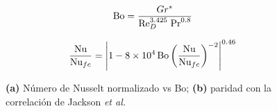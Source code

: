 \begin{equation}
\text{Bo}= \frac{Gr^*}{\text{Re}_D^{3.425} \hspace*{1mm} \text{Pr}^{0.8}}
\label{eq:jackson_bo}
\end{equation}

\begin{equation}
\frac{\text{Nu}}{\text{Nu}_{fc}} =
\left\vert 1 - 8 \times 10^4 \hspace*{0.5mm} \text{Bo}
\left( \frac{\text{Nu}}{\text{Nu}_{fc}} \right)^{-2} \right\vert^{0.46}
\label{eq:jackson_corr}
\end{equation}

\begin{figure}[H]
  \centering
  \caption{\textbf{(a)} Número de Nusselt normalizado vs Bo; \textbf{(b)} paridad con la correlación de Jackson \textit{et al.}}
  \label{fig:nusselt}
\end{figure}



